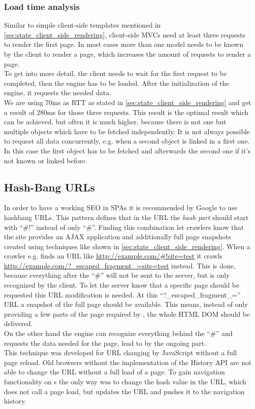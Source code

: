 \subsubsection{Load time analysis}
Similar to simple client-side templates mentioned in \ref{sec:state_client_side_rendering}, client-side MVCs need at least three requests to render the first page.
In most cases more than one model needs to be known by the client to render a page, which increases the amount of requests to render a page.
\\
To get into more detail, the client needs to wait for the first request to be completed, then the \ajax{} engine has to be loaded.
After the initialization of the \ajax{} engine, it requests the needed data.
\\
We are using 70ms as RTT as stated in \ref{sec:state_client_side_rendering} and get a result of 280ms for those three requests.
This result is the optimal result which can be achieved, but often it is much higher, because there is not one but multiple objects which have to be fetched independently.
It is not always possible to request all data concurrently, e.g. when a second object is linked in a first one.
In this case the first object has to be fetched and afterwards the second one if it's not known or linked before.

\subsection{Hash-Bang URLs\label{hashbangurls}}
In order to have a working SEO in SPAs it is recommended by Google to use hashbang URLs.
This pattern defines that in the URL the \emph{hash part} should start with \enquote{\#!} instead of only \enquote{\#}.
Finding this combination let crawlers know that the site provides an AJAX application and additionally full page snapshots created using techniques like shown in \ref{sec:state_client_side_rendering}.
When a crawler e.g. finds an URL like \url{http://example.com/\#!site=test} it crawls \newline \url{http://example.com/?\_escaped\_fragment\_=site=test} instead.
This is done, because everything after the \enquote{\#} will not be sent to the server, but is only recognized by the client.
To let the server know that a specific page should be requested this URL modification is needed.
At this \enquote{?\_escaped\_fragment\_=} URL a snapshot of the full page should be available.
This means, instead of only providing a few parts of the page required by \ajax{}, the whole HTML DOM should be delivered.
\\
On the other hand the \ajax{} engine can recognize everything behind the \enquote{\#} and requests the data needed for the page, lead to by the ongoing part.
\\
This technique was developed for URL changing by JavaScript without a full page reload.
Old browsers without the implementation of the History API are not able to change the URL without a full load of a page.
To gain navigation functionality on \singlePageApplication{}s the only way was to change the hash value in the URL, which does not call a page load, but updates the URL and pushes it to the navigation history.

